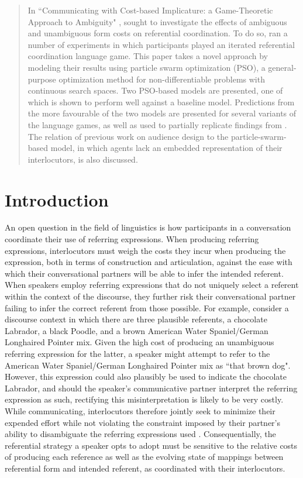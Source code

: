 \documentclass[12pt,a4paper]{article}
\begin{document}
\begin{abstract}
In ``Communicating with Cost-based Implicature: a Game-Theoretic Approach to Ambiguity" \citeyearpar{rohde2012}, \citeauthor{rohde2012} sought to investigate the effects of ambiguous and unambiguous form costs on referential coordination. To do so, \citeauthor{rohde2012} ran a number of experiments in which participants played an iterated referential coordination language game. This paper takes a novel approach by modeling their results using particle swarm optimization (PSO), a general-purpose optimization method for non-differentiable problems with continuous search spaces. Two PSO-based models are presented, one of which is shown to perform well against a baseline model. Predictions from the more favourable of the two models are presented for several variants of the \citeauthor{rohde2012} language games, as well as used to partially replicate findings from \cite{brennan1996}. The relation of previous work on audience design to the particle-swarm-based model, in which agents lack an embedded representation of their interlocutors, is also discussed.
\end{abstract}

\pagebreak


\tableofcontents

\pagebreak


\section{Introduction}
An open question in the field of linguistics is how participants in a conversation coordinate their use of referring expressions. When producing referring expressions, interlocutors must weigh the costs they incur when producing the expression, both in terms of construction and articulation, against the ease with which their conversational partners will be able to infer the intended referent. When speakers employ referring expressions that do not uniquely select a referent within the context of the discourse, they further risk their conversational partner failing to infer the correct referent from those possible. For example, consider a discourse context in which there are three plausible referents, a chocolate Labrador, a black Poodle, and a brown American Water Spaniel/German Longhaired Pointer mix. Given the high cost of producing an unambiguous referring expression for the latter, a speaker might attempt to refer to the American Water Spaniel/German Longhaired Pointer mix as ``that brown dog". However, this expression could also plausibly be used to indicate the chocolate Labrador, and should the speaker's communicative partner interpret the referring expression as such, rectifying this misinterpretation is likely to be very costly. While communicating, interlocutors therefore jointly seek to minimize their expended effort while not violating the constraint imposed by their partner's ability to disambiguate the referring expressions used \citep[p.~65-66]{benz2005}. Consequentially, the referential strategy a speaker opts to adopt must be sensitive to the relative costs of producing each reference as well as the evolving state of mappings between referential form and intended referent, as coordinated with their interlocutors. 
\end{document}
